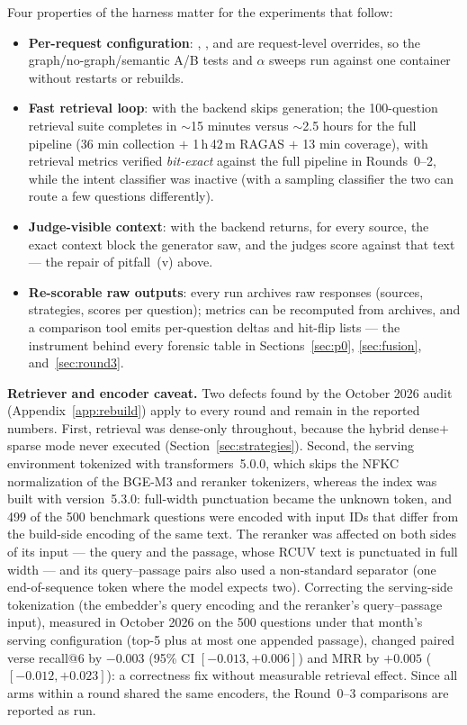 Four properties of the harness matter for the experiments that follow:

\begin{itemize}
\item \textbf{Per-request configuration}: ,
, and  are request-level
overrides, so the graph/no-graph/semantic A/B tests and $\alpha$ sweeps
run against one container without restarts or rebuilds.
\item \textbf{Fast retrieval loop}: with 
the backend skips generation; the 100-question retrieval suite completes
in $\sim$15 minutes versus $\sim$2.5 hours for the full pipeline
(36 min collection $+$ 1\,h\,42\,m RAGAS $+$ 13 min coverage), with
retrieval metrics verified \emph{bit-exact} against the full pipeline
in Rounds~0--2, while the intent classifier was inactive (with a
sampling classifier the two can route a few questions differently).
\item \textbf{Judge-visible context}: with 
the backend returns, for every source, the exact context block the
generator saw, and the judges score against that text --- the repair of
pitfall~(v) above.
\item \textbf{Re-scorable raw outputs}: every run archives raw responses
(sources, strategies, scores per question); metrics can be recomputed
from archives, and a comparison tool emits per-question deltas and
hit-flip lists --- the instrument behind every forensic table in
Sections~\ref{sec:p0}, \ref{sec:fusion}, and~\ref{sec:round3}.
\end{itemize}

\textbf{Retriever and encoder caveat.} Two defects found by the
October 2026 audit (Appendix~\ref{app:rebuild}) apply to every round and
remain in the reported numbers. First, retrieval was dense-only
throughout, because the hybrid dense$+$sparse mode never executed
(Section~\ref{sec:strategies}). Second, the serving environment
tokenized with transformers~5.0.0, which skips the NFKC normalization of
the BGE-M3 and reranker tokenizers, whereas the index was built with
version~5.3.0: full-width punctuation became the unknown token, and 499
of the 500 benchmark questions were encoded with input IDs that differ
from the build-side encoding of the same text. The reranker was affected
on both sides of its input --- the query and the passage, whose RCUV
text is punctuated in full width --- and its query--passage pairs also
used a non-standard separator (one end-of-sequence token where the model
expects two). Correcting the serving-side tokenization (the embedder's
query encoding and the reranker's query--passage input), measured in
October 2026 on the 500 questions under that month's serving
configuration (top-5 plus at most one appended passage), changed paired
verse recall@6 by $-0.003$ (95\% CI $[-0.013,+0.006]$) and MRR by
$+0.005$ ($[-0.012,+0.023]$): a correctness fix without measurable
retrieval effect. Since all arms within a round shared the same
encoders, the Round~0--3 comparisons are reported as run.
